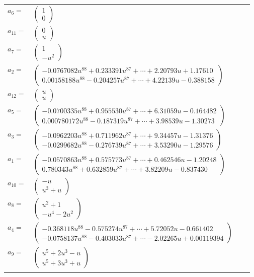 \documentclass[1p]{elsarticle_modified}
\theoremstyle{definition}
\begin{document}
\begin{tabular}{m{7pt} m{180pt} m{7pt} m{180pt} }
\flushright $a_{6}=$&$\begin{pmatrix}1\\0\end{pmatrix}$ \\
\flushright $a_{11}=$&$\begin{pmatrix}0\\u\end{pmatrix}$ \\
\flushright $a_{7}=$&$\begin{pmatrix}1\\- u^2\end{pmatrix}$ \\
\flushright $a_{2}=$&$\begin{pmatrix}-0.0767082 u^{88}+0.233391 u^{87}+\cdots+2.20793 u+1.17610\\0.00158188 u^{88}-0.204257 u^{87}+\cdots+4.22139 u-0.388158\end{pmatrix}$ \\
\flushright $a_{12}=$&$\begin{pmatrix}u\\u\end{pmatrix}$ \\
\flushright $a_{5}=$&$\begin{pmatrix}-0.0700335 u^{88}+0.955530 u^{87}+\cdots+6.31059 u-0.164482\\0.000780172 u^{88}-0.187319 u^{87}+\cdots+3.98539 u-1.30273\end{pmatrix}$ \\
\flushright $a_{3}=$&$\begin{pmatrix}-0.0962203 u^{88}+0.711962 u^{87}+\cdots+9.34457 u-1.31376\\-0.0299682 u^{88}-0.276739 u^{87}+\cdots+3.53290 u-1.29576\end{pmatrix}$ \\
\flushright $a_{1}=$&$\begin{pmatrix}-0.0570863 u^{88}+0.575773 u^{87}+\cdots+0.462546 u-1.20248\\0.780343 u^{88}+0.632859 u^{87}+\cdots+3.82209 u-0.837430\end{pmatrix}$ \\
\flushright $a_{10}=$&$\begin{pmatrix}- u\\u^3+u\end{pmatrix}$ \\
\flushright $a_{8}=$&$\begin{pmatrix}u^2+1\\- u^4-2 u^2\end{pmatrix}$ \\
\flushright $a_{4}=$&$\begin{pmatrix}-0.368118 u^{88}-0.575274 u^{87}+\cdots+5.72052 u-0.661402\\-0.0758137 u^{88}-0.403033 u^{87}+\cdots-2.02265 u+0.00119394\end{pmatrix}$ \\
\flushright $a_{9}=$&$\begin{pmatrix}u^5+2 u^3- u\\u^5+3 u^3+u\end{pmatrix}$\\&\end{tabular}
\end{document}
